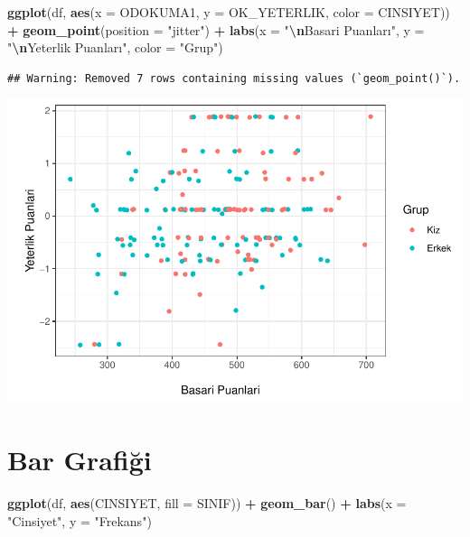 \documentclass[
  oneside]{book}
\newenvironment{Shaded}{\begin{snugshade}}{\end{snugshade}}
\newcommand{\AttributeTok}[1]{\textcolor[rgb]{0.13,0.29,0.53}{#1}}
\newcommand{\FunctionTok}[1]{\textcolor[rgb]{0.13,0.29,0.53}{\textbf{#1}}}
\newcommand{\NormalTok}[1]{#1}
\newcommand{\SpecialCharTok}[1]{\textcolor[rgb]{0.81,0.36,0.00}{\textbf{#1}}}
\newcommand{\StringTok}[1]{\textcolor[rgb]{0.31,0.60,0.02}{#1}}
\begin{document}
\begin{Shaded}
\begin{Highlighting}[]
\FunctionTok{ggplot}\NormalTok{(df, }\FunctionTok{aes}\NormalTok{(}\AttributeTok{x =}\NormalTok{ ODOKUMA1,}
\AttributeTok{y =}\NormalTok{ OK\_YETERLIK,}
\AttributeTok{color =}\NormalTok{ CINSIYET)) }\SpecialCharTok{+}
\FunctionTok{geom\_point}\NormalTok{(}\AttributeTok{position =} \StringTok{"jitter"}\NormalTok{) }\SpecialCharTok{+}
  \FunctionTok{labs}\NormalTok{(}\AttributeTok{x =} \StringTok{"}\SpecialCharTok{\textbackslash{}n}\StringTok{Basari Puanları"}\NormalTok{,}
       \AttributeTok{y =} \StringTok{"}\SpecialCharTok{\textbackslash{}n}\StringTok{Yeterlik Puanları"}\NormalTok{,}
       \AttributeTok{color =} \StringTok{"Grup"}\NormalTok{)}
\end{Highlighting}
\end{Shaded}

\begin{verbatim}
## Warning: Removed 7 rows containing missing values (`geom_point()`).
\end{verbatim}

\begin{center}\includegraphics[width=1\linewidth]{15-betimleyici-istatistik_files/figure-latex/unnamed-chunk-55-1} \end{center}

\hypertarget{bar-grafiux11fi}{%
\section{Bar Grafiği}\label{bar-grafiux11fi}}

\begin{Shaded}
\begin{Highlighting}[]
\FunctionTok{ggplot}\NormalTok{(df, }\FunctionTok{aes}\NormalTok{(CINSIYET, }\AttributeTok{fill =}\NormalTok{ SINIF)) }\SpecialCharTok{+}   \FunctionTok{geom\_bar}\NormalTok{() }\SpecialCharTok{+}
  \FunctionTok{labs}\NormalTok{(}\AttributeTok{x =} \StringTok{"Cinsiyet"}\NormalTok{,}
       \AttributeTok{y =} \StringTok{"Frekans"}\NormalTok{)}
\end{Highlighting}
\end{Shaded}
\end{document}
